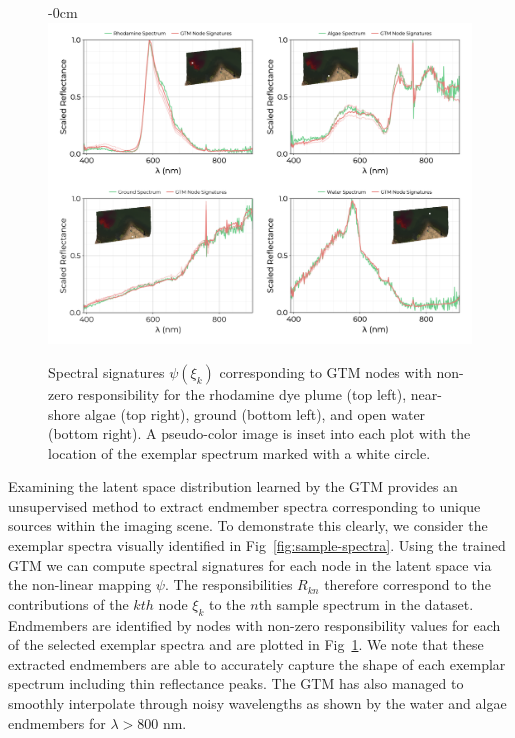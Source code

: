 \documentclass[remotesensing,article,submit,pdftex,moreauthors]{Definitions/mdpi}
\begin{document}
\begin{figure}[t]
\begin{adjustwidth}{-\extralength}{0cm}
\centering
\includegraphics[width=17.0cm]{paper/figures/results/spectral-signatures.png}
\end{adjustwidth}
\caption{Spectral signatures $\psi(\xi_k)$ corresponding to GTM nodes with non-zero responsibility for the rhodamine dye plume (top left), near-shore algae (top right), ground (bottom left), and open water (bottom right). A pseudo-color image is inset into each plot with the location of the exemplar spectrum marked with a white circle. \label{fig:spectral-signatures}}
\end{figure}  

Examining the latent space distribution learned by the GTM provides an unsupervised method to extract endmember spectra corresponding to unique sources within the imaging scene. To demonstrate this clearly, we consider the exemplar spectra visually identified in Fig~\ref{fig:sample-spectra}. Using the trained GTM we can compute spectral signatures for each node in the latent space via the non-linear mapping $\psi$. The responsibilities $R_{kn}$ therefore correspond to the contributions of the $kth$ node $\xi_k$ to the $n$th sample spectrum in the dataset. Endmembers are identified by nodes with non-zero responsibility values for each of the selected exemplar spectra and are plotted in Fig~\ref{fig:spectral-signatures}. We note that these extracted endmembers are able to accurately capture the shape of each exemplar spectrum including thin reflectance peaks. The GTM has also managed to smoothly interpolate through noisy wavelengths as shown by the water and algae endmembers for $\lambda > 800$ nm. 
\end{document}
